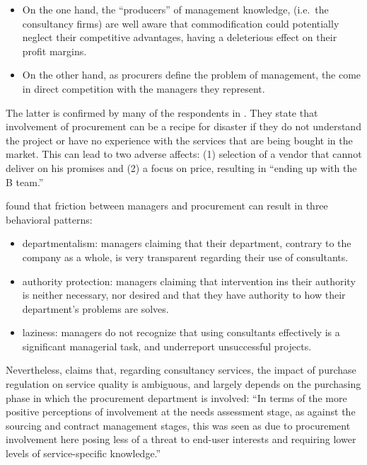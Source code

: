 \documentclass[12pt]{article}
\begin{document}
\begin{itemize}
\item
  On the one hand, the ``producers'' of management knowledge, (i.e.~the
  consultancy firms) are well aware that commodification could
  potentially neglect their competitive advantages, having a deleterious
  effect on their profit margins.
\item
  On the other hand, as procurers define the problem of management, the
  come in direct competition with the managers they represent.
\end{itemize}

The latter is confirmed by many of the respondents in
\citet[161-163]{lonsdale2017}. They state that involvement of
procurement can be a recipe for disaster if they do not understand the
project or have no experience with the services that are being bought in
the market. This can lead to two adverse affects: (1) selection of a
vendor that cannot deliver on his promises and (2) a focus on price,
resulting in ``ending up with the B team.''

\citet[305-306]{honer2006} found that friction between managers and
procurement can result in three behavioral patterns:

\begin{itemize}
\item
  departmentalism: managers claiming that their department, contrary to
  the company as a whole, is very transparent regarding their use of
  consultants.
\item
  authority protection: managers claiming that intervention ins their
  authority is neither necessary, nor desired and that they have
  authority to how their department's problems are solves.
\item
  laziness: managers do not recognize that using consultants effectively
  is a significant managerial task, and underreport unsuccessful
  projects.
\end{itemize}

Nevertheless, \citet[164]{lonsdale2017} claims that, regarding
consultancy services, the impact of purchase regulation on service
quality is ambiguous, and largely depends on the purchasing phase in
which the procurement department is involved: ``In terms of the more
positive perceptions of involvement at the needs assessment stage, as
against the sourcing and contract management stages, this was seen as
due to procurement involvement here posing less of a threat to end-user
interests and requiring lower levels of service-specific knowledge.''
\end{document}
